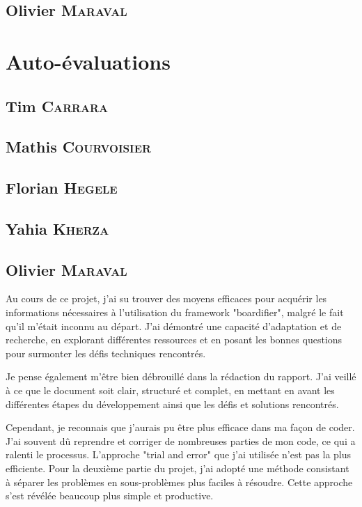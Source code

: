 \subsection*{Olivier \textsc{Maraval}}


\section{Auto-évaluations}

\subsection*{Tim \textsc{Carrara}}

\subsection*{Mathis \textsc{Courvoisier}}

\subsection*{Florian \textsc{Hegele}}

\subsection*{Yahia \textsc{Kherza}}

\subsection*{Olivier \textsc{Maraval}}

Au cours de ce projet, j'ai su trouver des moyens efficaces pour acquérir les informations nécessaires à l'utilisation du framework "boardifier", malgré le fait qu'il m'était inconnu au départ. J'ai démontré une capacité d'adaptation et de recherche, en explorant différentes ressources et en posant les bonnes questions pour surmonter les défis techniques rencontrés.

Je pense également m'être bien débrouillé dans la rédaction du rapport. J'ai veillé à ce que le document soit clair, structuré et complet, en mettant en avant les différentes étapes du développement ainsi que les défis et solutions rencontrés.

Cependant, je reconnais que j'aurais pu être plus efficace dans ma façon de coder. J'ai souvent dû reprendre et corriger de nombreuses parties de mon code, ce qui a ralenti le processus. L'approche "trial and error" que j'ai utilisée n'est pas la plus efficiente. Pour la deuxième partie du projet, j'ai adopté une méthode consistant à séparer les problèmes en sous-problèmes plus faciles à résoudre. Cette approche s'est révélée beaucoup plus simple et productive.

